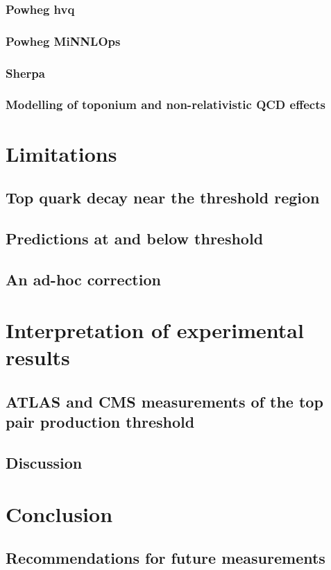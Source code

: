 \documentclass[aps,prd,twocolumn,floatfix,superscriptaddress,longbibliography,10pt]{revtex4-2}
\begin{document}
\subsubsection{Powheg hvq}
\subsubsection{Powheg MiNNLOps}
\subsubsection{Sherpa}
\subsubsection{Modelling of toponium and non-relativistic QCD effects}

\section{Limitations}
\label{sec:limitations}
\subsection{Top quark decay near the threshold region}
\subsection{Predictions at and below threshold}
\subsection{An ad-hoc correction}

\section{Interpretation of experimental results}
\label{sec:results}
\subsection{ATLAS and CMS measurements of the top pair production threshold}
\subsection{Discussion}

\section{Conclusion}
\label{sec:conclusion}
\subsection{Recommendations for future measurements}
\end{document}
